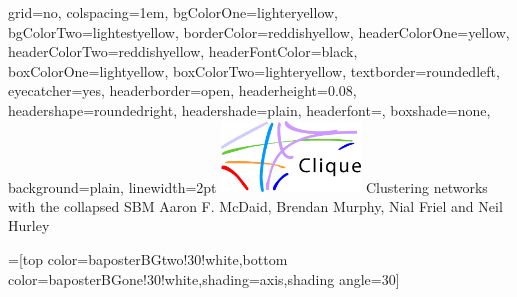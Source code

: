 \documentclass[portrait,final,a0paper]{baposter}
\begin{document}
\newlength{\leftimgwidth}
\begin{poster}%
  {
  grid=no,
  colspacing=1em,
  bgColorOne=lighteryellow,
  bgColorTwo=lightestyellow,
  borderColor=reddishyellow,
  headerColorOne=yellow,
  headerColorTwo=reddishyellow,
  headerFontColor=black,
  boxColorOne=lightyellow,
  boxColorTwo=lighteryellow,
  textborder=roundedleft,
  eyecatcher=yes,
  headerborder=open,
  headerheight=0.08\textheight,
  headershape=roundedright,
  headershade=plain,
  headerfont=\Large\textsf, %
  boxshade=none,
  background=plain,
  linewidth=2pt
  }
  {\includegraphics[width=10em]{clique}} %
  {\sf %
  Clustering networks with the collapsed SBM}
  {\sf %
  Aaron F. McDaid, Brendan Murphy, Nial Friel and Neil Hurley
  }
  {%
  }

  =[top color=baposterBGtwo!30!white,bottom color=baposterBGone!30!white,shading=axis,shading angle=30]

     \setlength{\leftimgwidth}{0.78em+8.0em}


\end{poster}
\end{document}
